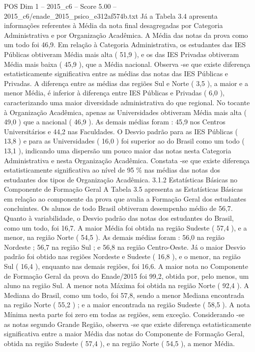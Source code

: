 \begin{textsample}{POS Dim 1 – 2015\_c6 – Score 5.00 – 2015\_c6/enade\_2015\_psico\_e312af574b.txt}
Já a Tabela 3.4 apresenta informações referentes à Média da nota final desagregadas por Categoria Administrativa e por Organização Acadêmica.
A Média das notas da prova como um todo foi 46,9.
Em relação à Categoria Administrativa, os estudantes das IES Públicas obtiveram Média mais alta ( 51,9 ), e os das IES Privadas obtiveram Média mais baixa ( 45,9 ), que a Média nacional.
Observa -se que existe diferença estatisticamente significativa entre as médias das notas das IES Públicas e Privadas.
A diferença entre as médias das regiões Sul e Norte ( 3,5 ), a maior e a menor Média, é inferior à diferença entre IES Públicas e Privadas ( 6,0 ), caracterizando uma maior diversidade administrativa do que regional.
No tocante à Organização Acadêmica, apenas as Universidades obtiveram Média mais alta ( 49,0 ) que a nacional ( 46,9 ).
As demais médias foram : 45,9 nos Centros Universitários e 44,2 nas Faculdades.
O Desvio padrão para as IES Públicas ( 13,8 ) e para as Universidades ( 16,0 ) foi superior ao do Brasil como um todo ( 13,1 ), indicando uma dispersão um pouco maior das notas nesta Categoria Administrativa e nesta Organização Acadêmica.
Constata -se que existe diferença estatisticamente significativa ao nível de 95 \% nas médias das notas dos estudantes dos tipos de Organização Acadêmica. 3.1.2 Estatísticas Básicas no Componente de Formação Geral A Tabela 3.5 apresenta as Estatísticas Básicas em relação ao componente da prova que avalia a Formação Geral dos estudantes concluintes.
Os alunos de todo Brasil obtiveram desempenho médio de 56,7.
Quanto à variabilidade, o Desvio padrão das notas dos estudantes do Brasil, como um todo, foi 16,7.
A maior Média foi obtida na região Sudeste ( 57,4 ), e a menor, na região Norte ( 54,5 ).
As demais médias foram : 56,0 na região Nordeste ; 56,7 na região Sul ; e 56,8 na região Centro-Oeste.
Já o maior Desvio padrão foi obtido nas regiões Nordeste e Sudeste ( 16,8 ), e o menor, na região Sul ( 16,4 ), enquanto nas demais regiões, foi 16,6.
A maior nota no Componente de Formação Geral da prova do Enade/2015 foi 99,2, obtida por, pelo menos, um aluno na região Sul.
A menor nota Máxima foi obtida na região Norte ( 92,4 ).
A Mediana do Brasil, como um todo, foi 57,8, sendo a menor Mediana encontrada na região Norte ( 55,2 ) ; e a maior encontrada na região Sudeste ( 58,5 ).
A nota Mínima nesta parte foi zero em todas as regiões, sem exceção.
Considerando -se as notas segundo Grande Região, observa -se que existe diferença estatisticamente significativa entre a maior Média das notas do Componente de Formação Geral, obtida na região Sudeste ( 57,4 ), e na região Norte ( 54,5 ), a menor Média.

\end{textsample}
